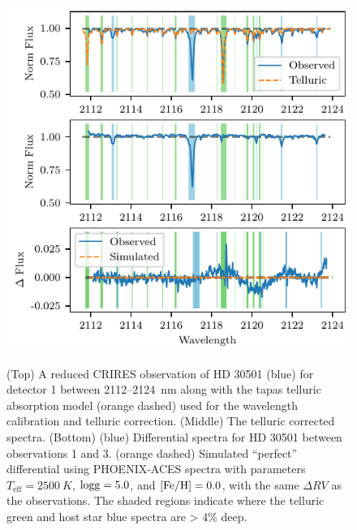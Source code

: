 \documentclass[fleqn,usenatbib]{mnras}
\begin{document}
    
    \begin{figure}
        \includegraphics[width=\hsize]{images/differential.pdf}\\
        \caption{ (Top) A reduced CRIRES observation of {HD 30501} (blue) for detector 1 between 2112--2124~nm along with the tapas telluric absorption model ({orange} dashed) used for the wavelength calibration and telluric correction. (Middle) The telluric corrected spectra. (Bottom) ({blue}) Differential spectra for {HD 30501} between observations 1 and 3. ({orange} dashed) Simulated ``perfect'' differential using PHOENIX-ACES spectra with parameters \(T_{\textrm{eff}} = 2500~K \), \(\rm logg=5.0\), and \(\rm [Fe/H]=0.0 \), with the same \(\Delta RV \) as the observations. The shaded regions indicate where the telluric {green} and host star {blue} spectra are > 4\% deep.}
        \label{fig:spectral_example}
    \end{figure}
    
\end{document}
